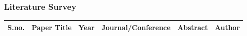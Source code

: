 \documentclass{beamer}
\newcommand\tab[1][1cm]{\hspace*{#1}}
\begin{document}
\begin{frame}[t, allowframebreaks]
\frametitle{\tab \tab \tab \tab \huge Literature Survey}
\tiny
\raggedleft
\label{Fig:}
\begin{longtable}{|p{0.28cm}|p{1.8cm}|p{0.3cm}|p{1.8cm}|p{3.5cm}|p{1.3cm}|}
\hline
\textbf{S.no.} & \textbf{Paper Title}                                                           & \textbf{Year} & \textbf{Journal/Conference}                                                                                   & \textbf{Abstract}                                                                                                                                                                                                                                                                                                                                                   & \textbf{Author}                                       \\ \hline


\end{longtable}
\end{frame}
\end{document}
